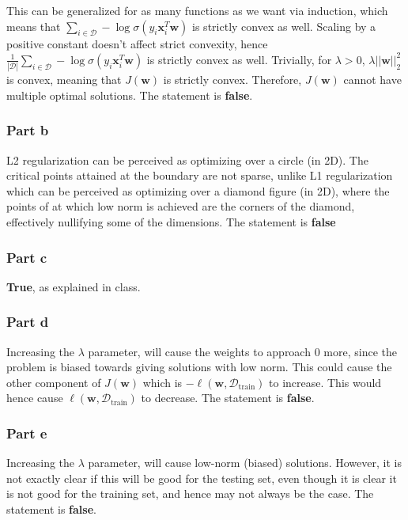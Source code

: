 \documentclass{article}
\newcommand{\vct}[1]{\mathbf{#1}}
\begin{document}
\begin{flushleft}
This can be generalized for as many functions as we want via induction, which means that \(\displaystyle\sum_{i \in \mathcal{D}} -\log \sigma(y_{i}\vct{x}_{i}^{T}\vct{w})\) is strictly convex as well. Scaling by a positive constant doesn't affect strict convexity, hence \(\displaystyle\frac{1}{|\mathcal{D}|}\sum_{i \in \mathcal{D}} -\log \sigma(y_{i}\vct{x}_{i}^{T}\vct{w})\) is strictly convex as well. Trivially, for \(\lambda > 0\), \(\lambda ||\vct{w}||_{2}^{2}\) is convex, meaning that \(J(\vct{w})\) is strictly convex. Therefore, \(J(\vct{w})\) cannot have multiple optimal solutions. The statement is \textbf{false}.
\end{flushleft}

\subsubsection*{Part b}
L2 regularization can be perceived as optimizing over a circle (in 2D). The critical points attained at the boundary are not sparse, unlike L1 regularization which can be perceived as optimizing over a diamond figure (in 2D), where the points of at which low norm is achieved are the corners of the diamond, effectively nullifying some of the dimensions. The statement is \textbf{false}

\subsubsection*{Part c}
\textbf{True}, as explained in class.

\subsubsection*{Part d}
Increasing the \(\lambda\) parameter, will cause the weights to approach \(0\) more, since the problem is biased towards giving solutions with low norm. This could cause the other component of \(J(\vct{w})\) which is \(-\ell(\vct{w}, \mathcal{D}_{\text{train}})\) to increase. This would hence cause \(\ell(\vct{w}, \mathcal{D}_{\text{train}})\) to decrease. The statement is \textbf{false}.

\subsubsection*{Part e}
Increasing the \(\lambda\) parameter, will cause low-norm (biased) solutions. However, it is not exactly clear if this will be good for the testing set, even though it is clear it is not good for the training set, and hence may not always be the case. The statement is \textbf{false}.
\end{document}
